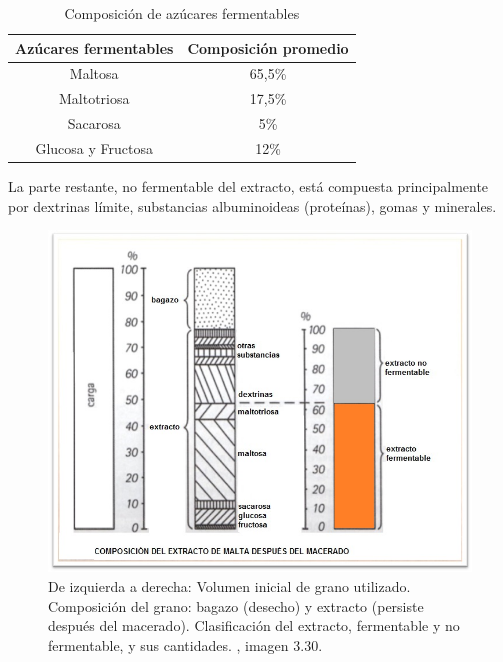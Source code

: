             \begin{table}[h]
                \centering
                \begin{tabular}{|c|c|}
                    \hline
                     Azúcares fermentables &  Composición promedio \\
                     \hline
                     Maltosa & 65,5\% \\
                     \hline
                     Maltotriosa & 17,5\% \\
                     \hline
                     Sacarosa & 5\% \\
                     \hline
                     Glucosa y Fructosa & 12\% \\
                     \hline
                \end{tabular}
                \caption{Composición de azúcares fermentables}
                \label{tab:ComposicionAzucaresFermentables}
            \end{table}
            
            \par La parte restante, no fermentable del extracto, está compuesta principalmente por dextrinas límite, substancias albuminoideas (proteínas), gomas y minerales.
            \begin{figure} [h]		                                                                        \centerline{\includegraphics[scale=0.6]{composicion_luego_macerado.jpg}}
                \caption{De izquierda a derecha: Volumen inicial de grano utilizado. Composición del grano: bagazo (desecho) y extracto (persiste después del macerado). Clasificación del extracto, fermentable y no fermentable, y sus cantidades. \cite{Kunze}, imagen 3.30.}
                \label{ComposicionExtracto}
            \end{figure}
            

